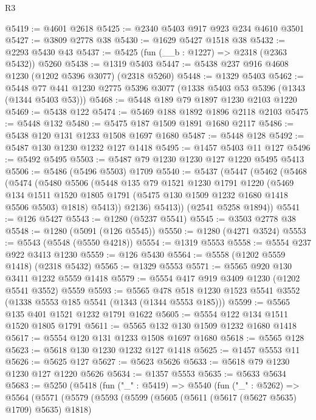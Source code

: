 \begin{lexlean}{R3}
\begin{coremodule}
@5419 := @4601 @2618
@5425 := @2340 @5403 @917 @923 @234 @4610 @3501
@5427 := @3809 @2778 @38
@5430 := @1629 @5427 @1518 @38
@5432 := @2293 @5430 @43
@5437 := @5425 (fun (__b : @1227) => @2318 (@2363 @5432)) @5260
@5438 := @1319 @5403
@5447 := @5438 @237 @916 @4608 @1230 (@1202 @5396 @3077) (@2318 @5260)
@5448 := @1329 @5403
@5462 := @5448 @77 @441 @1230 @2775 @5396 @3077 (@1338 @5403 @53 @5396 (@1343 (@1344 @5403 @53)))
@5468 := @5448 @189 @79 @1897 @1230 @2103 @1220
@5469 := @5438 @122
@5474 := @5469 @188 @1892 @1896 @2118 @2103
@5475 := @5448 @132
@5480 := @5475 @187 @1509 @1891 @1680 @2117
@5486 := @5438 @120 @131 @1233 @1508 @1697 @1680
@5487 := @5448 @128
@5492 := @5487 @130 @1230 @1232 @127 @1418
@5495 := @1457 @5403 @11 @127
@5496 := @5492 @5495
@5503 := @5487 @79 @1230 @1230 @127 @1220 @5495 @5413
@5506 := @5486 (@5496 @5503) @1709
@5540 := @5437
    (@5447
      (@5462
        (@5468
          (@5474
            (@5480
              @5506
              (@5448
                @135
                @79
                @1521
                @1230
                @1791
                @1220
                (@5469
                  @134
                  @1511
                  @1520
                  @1805
                  @1791
                  (@5475 @130 @1509 @1232 @1680 @1418 @5506 @5503)
                  @1818)
                @5413))
            @2136)
          @5413))
      (@2541 @5258 @1894))
@5541 := @126 @5427
@5543 := @1280 (@5237 @5541)
@5545 := @3503 @2778 @38
@5548 := @1280 (@5091 (@126 @5545))
@5550 := @1280 (@4271 @3524)
@5553 := @5543 (@5548 (@5550 @4218))
@5554 := @1319 @5553
@5558 := @5554 @237 @922 @3413 @1230
@5559 := @126 @5430
@5564 := @5558 (@1202 @5559 @1418) (@2318 @5432)
@5565 := @1329 @5553
@5571 := @5565 @920 @130 @3411 @1232 @5559 @1418
@5579 := @5554 @417 @919 @3409 @1230 (@1202 @5541 @3552) @5559
@5593 := @5565 @478 @518 @1230 @1523 @5541 @3552 (@1338 @5553 @185 @5541 (@1343 (@1344 @5553 @185)))
@5599 := @5565 @135 @401 @1521 @1232 @1791 @1622
@5605 := @5554 @122 @134 @1511 @1520 @1805 @1791
@5611 := @5565 @132 @130 @1509 @1232 @1680 @1418
@5617 := @5554 @120 @131 @1233 @1508 @1697 @1680
@5618 := @5565 @128
@5623 := @5618 @130 @1230 @1232 @127 @1418
@5625 := @1457 @5553 @11
@5626 := @5625 @127
@5627 := @5623 @5626
@5633 := @5618 @79 @1230 @1230 @127 @1220 @5626
@5634 := @1357 @5553
@5635 := @5633 @5634
@5683 := @5250
    (@5418
      (fun ("_" : @5419) =>
      @5540
        (fun ("_" : @5262) =>
        @5564
          (@5571
            (@5579
              (@5593
                (@5599
                  (@5605 (@5611 (@5617 (@5627 @5635) @1709) @5635) @1818)

\end{coremodule}
\end{lexlean}

